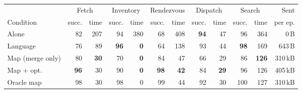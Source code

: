 \setlength{\tabcolsep}{4pt}
\begin{tabular}{lrrrrrrrrrrr}
\toprule
 & \multicolumn{2}{c}{Fetch} & \multicolumn{2}{c}{Inventory} & \multicolumn{2}{c}{Rendezvous} & \multicolumn{2}{c}{Dispatch} & \multicolumn{2}{c}{Search} & Sent \\
\cmidrule(lr){2-3}\cmidrule(lr){4-5}\cmidrule(lr){6-7}\cmidrule(lr){8-9}\cmidrule(lr){10-11}
Condition & succ. & time & succ. & time & succ. & time & succ. & time & succ. & time & per ep. \\
\midrule
Alone & 82 & 207 & 94 & 380 & 68 & 408 & \textbf{94} & 47 & 96 & 364 & 0\,B \\
Language & 76 & 89 & \textbf{96} & \textbf{0} & 64 & 138 & 93 & 44 & \textbf{98} & 169 & 643\,B \\
Map (merge only) & 80 & \textbf{30} & 70 & \textbf{0} & 84 & 47 & 66 & 29 & 86 & \textbf{126} & 310\,kB \\
Map + opt. & \textbf{96} & 30 & 90 & \textbf{0} & \textbf{98} & \textbf{42} & 84 & \textbf{29} & 96 & 126 & 405\,kB \\
\midrule
Oracle map & 98 & 30 & 98 & 0 & 99 & 44 & 92 & 30 & 100 & 127 & 310\,kB \\
\bottomrule
\end{tabular}
